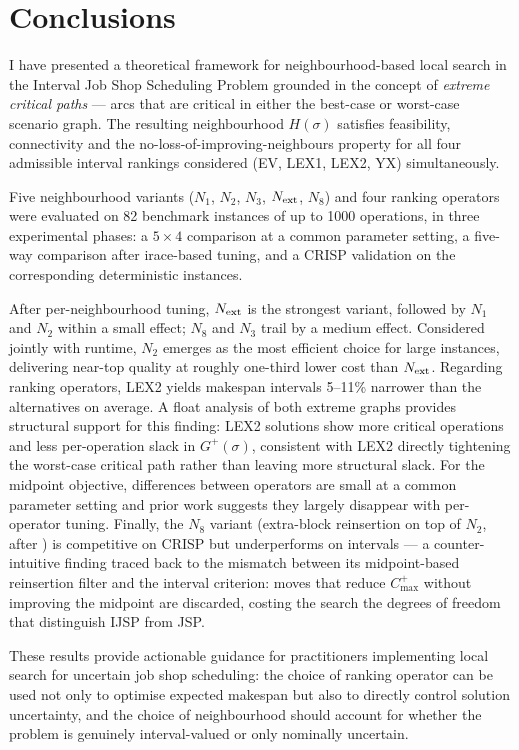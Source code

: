 \documentclass[preprint,12pt]{elsarticle}
\begin{document}
\section{Conclusions}
\label{sec8}

I have presented a theoretical framework for neighbourhood-based local search in the Interval Job Shop Scheduling Problem grounded in the concept of \emph{extreme critical paths} --- arcs that are critical in either the best-case or worst-case scenario graph. The resulting neighbourhood $H(\sigma)$ satisfies feasibility, connectivity and the no-loss-of-improving-neighbours property for all four admissible interval rankings considered (EV, LEX1, LEX2, YX) simultaneously.

Five neighbourhood variants ($N_1$, $N_2$, $N_3$, $N_{\rm ext}$, $N_8$) and four ranking operators were evaluated on 82 benchmark instances of up to 1000 operations, in three experimental phases: a $5 \times 4$ comparison at a common parameter setting, a five-way comparison after irace-based tuning, and a CRISP validation on the corresponding deterministic instances.

After per-neighbourhood tuning, $N_{\rm ext}$ is the strongest variant, followed by $N_1$ and $N_2$ within a small effect; $N_8$ and $N_3$ trail by a medium effect. Considered jointly with runtime, $N_2$ emerges as the most efficient choice for large instances, delivering near-top quality at roughly one-third lower cost than $N_{\rm ext}$. Regarding ranking operators, LEX2 yields makespan intervals 5--11\% narrower than the alternatives on average. A float analysis of both extreme graphs provides structural support for this finding: LEX2 solutions show more critical operations and less per-operation slack in $G^+(\sigma)$, consistent with LEX2 directly tightening the worst-case critical path rather than leaving more structural slack. For the midpoint objective, differences between operators are small at a common parameter setting and prior work suggests they largely disappear with per-operator tuning. Finally, the $N_8$ variant (extra-block reinsertion on top of $N_2$, after \cite{Xie2022}) is competitive on CRISP but underperforms on intervals --- a counter-intuitive finding traced back to the mismatch between its midpoint-based reinsertion filter and the interval criterion: moves that reduce $C^+_{\max}$ without improving the midpoint are discarded, costing the search the degrees of freedom that distinguish IJSP from JSP.

These results provide actionable guidance for practitioners implementing local search for uncertain job shop scheduling: the choice of ranking operator can be used not only to optimise expected makespan but also to directly control solution uncertainty, and the choice of neighbourhood should account for whether the problem is genuinely interval-valued or only nominally uncertain.
\end{document}

